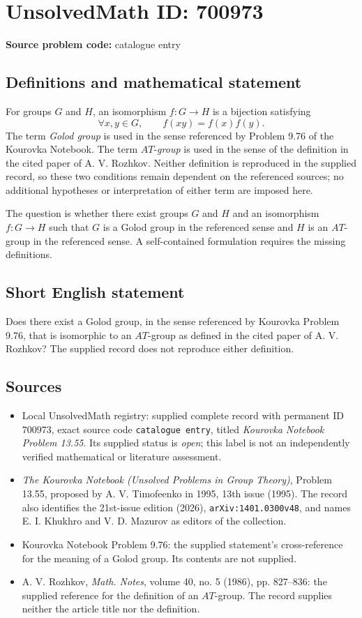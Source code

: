 \documentclass[11pt]{article}
\begin{document}
\section*{UnsolvedMath ID: 700973}
\textbf{Source problem code:} catalogue entry
\subsection{Definitions and mathematical statement}
For groups \(G\) and \(H\), an isomorphism \(f\colon G\to H\) is a bijection satisfying
\[
\forall x,y\in G,\qquad f(xy)=f(x)f(y).
\]
The term \emph{Golod group} is used in the sense referenced by Problem 9.76 of the Kourovka Notebook. The term \(AT\)-\emph{group} is used in the sense of the definition in the cited paper of A. V. Rozhkov. Neither definition is reproduced in the supplied record, so these two conditions remain dependent on the referenced sources; no additional hypotheses or interpretation of either term are imposed here.

The question is whether there exist groups \(G\) and \(H\) and an isomorphism \(f\colon G\to H\) such that \(G\) is a Golod group in the referenced sense and \(H\) is an \(AT\)-group in the referenced sense. A self-contained formulation requires the missing definitions.
\subsection{Short English statement}
Does there exist a Golod group, in the sense referenced by Kourovka Problem 9.76, that is isomorphic to an \(AT\)-group as defined in the cited paper of A. V. Rozhkov? The supplied record does not reproduce either definition.
\subsection{Sources}
\begin{itemize}
\item Local UnsolvedMath registry: supplied complete record with permanent ID \(700973\), exact source code \texttt{catalogue entry}, titled \emph{Kourovka Notebook Problem 13.55}. Its supplied status is \emph{open}; this label is not an independently verified mathematical or literature assessment.
\item \emph{The Kourovka Notebook (Unsolved Problems in Group Theory)}, Problem 13.55, proposed by A. V. Timofeenko in 1995, 13th issue (1995). The record also identifies the 21st-issue edition (2026), \texttt{arXiv:1401.0300v48}, and names E. I. Khukhro and V. D. Mazurov as editors of the collection.
\item Kourovka Notebook Problem 9.76: the supplied statement's cross-reference for the meaning of a Golod group. Its contents are not supplied.
\item A. V. Rozhkov, \emph{Math. Notes}, volume 40, no. 5 (1986), pp. 827--836: the supplied reference for the definition of an \(AT\)-group. The record supplies neither the article title nor the definition.
\end{itemize}
\end{document}
